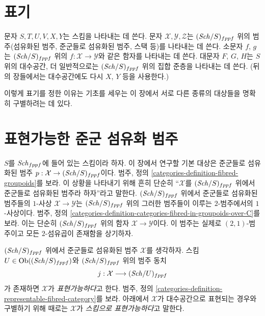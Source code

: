 \section{표기}
\label{section-notation}

\noindent
문자 $S, T, U, V, X, Y$는 스킴을 나타내는 데 쓴다. 문자
$\mathcal{X}, \mathcal{Y}, \mathcal{Z}$는 $(\mathit{Sch}/S)_{fppf}$ 위의
범주(섬유화된 범주, 준군들로 섬유화된 범주, 스택 등)를 나타내는 데 쓴다.
소문자 $f$, $g$는 $(\mathit{Sch}/S)_{fppf}$ 위의
$f : \mathcal{X} \to \mathcal{Y}$와 같은 함자를 나타내는 데 쓴다.
대문자 $F$, $G$, $H$는 $S$ 위의 대수공간, 더 일반적으로는
$(\mathit{Sch}/S)_{fppf}$ 위의 집합 준층을 나타내는 데 쓴다. (뒤의 장들에서는
대수공간에도 다시 $X$, $Y$ 등을 사용한다.)

\medskip\noindent
이렇게 표기를 정한 이유는 기초를 세우는 이 장에서 서로 다른 종류의
대상들을 명확히 구별하려는 데 있다.









\section{표현가능한 준군 섬유화 범주}
\label{section-representable}

\noindent
$S$를 $\mathit{Sch}_{fppf}$에 들어 있는 스킴이라 하자. 이 장에서 연구할 기본
대상은 준군들로 섬유화된 범주
$p : \mathcal{X} \to (\mathit{Sch}/S)_{fppf}$이다. 범주, 정의
\ref{categories-definition-fibred-groupoids}를 보라. 이 상황을 나타내기
위해 흔히 단순히 ``$\mathcal{X}$를 $(\mathit{Sch}/S)_{fppf}$ 위에서 준군들로
섬유화된 범주라 하자''라고 말한다. $(\mathit{Sch}/S)_{fppf}$ 위에서 준군들로
섬유화된 범주들의 $1$-사상 $\mathcal{X} \to \mathcal{Y}$는
$(\mathit{Sch}/S)_{fppf}$ 위의 그러한 범주들이 이루는 $2$-범주에서의
$1$-사상이다. 범주, 정의
\ref{categories-definition-categories-fibred-in-groupoids-over-C}를 보라.
이는 단순히 $(\mathit{Sch}/S)_{fppf}$ 위의 함자
$\mathcal{X} \to \mathcal{Y}$이다. 이 범주는 실제로 $(2, 1)$-범주이고
모든 $2$-섬유곱이 존재함을 상기하자.

\medskip\noindent
$(\mathit{Sch}/S)_{fppf}$ 위에서 준군들로 섬유화된 범주 $\mathcal{X}$를
생각하자. 스킴 $U \in \mathop{\mathrm{Ob}}\nolimits((\mathit{Sch}/S)_{fppf})$와 $(\mathit{Sch}/S)_{fppf}$
위의 범주 동치
$$
j : \mathcal{X} \longrightarrow (\mathit{Sch}/U)_{fppf}
$$
가 존재하면 $\mathcal{X}$가 {\it 표현가능하다}고 한다. 범주, 정의
\ref{categories-definition-representable-fibred-category}를 보라. 아래에서
$\mathcal{X}$가 대수공간으로 표현되는 경우와 구별하기 위해 때로는
$\mathcal{X}$가 {\it 스킴으로 표현가능하다}고 말한다.

